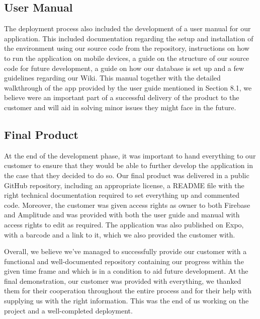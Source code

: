 \documentclass{l3proj}
\begin{document}
\subsection{User Manual}
The deployment process also included the development of a user manual for our application. This included documentation regarding the setup and installation of the environment using our source code from the repository, instructions on how to run the application on mobile devices, a guide on the structure of our source code for future development, a guide on how our database is set up and a few guidelines regarding our Wiki. This manual together with the detailed walkthrough of the app provided by the user guide mentioned in Section 8.1, we believe were an important part of a successful delivery of the product to the customer and will aid in solving minor issues they might face in the future.\par
\label{subsec: user manual}
\subsection{Final Product}
\label{subsec: Final Product}
At the end of the development phase, it was important to hand everything to our customer to ensure that they would be able to further develop the application in the case that they decided to do so. Our final product was delivered in a public GitHub repository, including an appropriate license, a README file with the right technical documentation required to set everything up and commented code. Moreover, the customer was given access rights as owner to both Firebase and Amplitude and was provided with both the user guide and manual with access rights to edit as required. The application was also published on Expo, with a barcode and a link to it, which we also provided the customer with.\par
Overall, we believe we've managed to successfully provide our customer with a functional and well-documented repository containing our progress within the given time frame and which is in a condition to aid future development. At the final demonstration, our customer was provided with everything, we thanked them for their cooperation throughout the entire process and for their help with supplying us with the right information. This was the end of us working on the project and a well-completed deployment.\par


\end{document}
